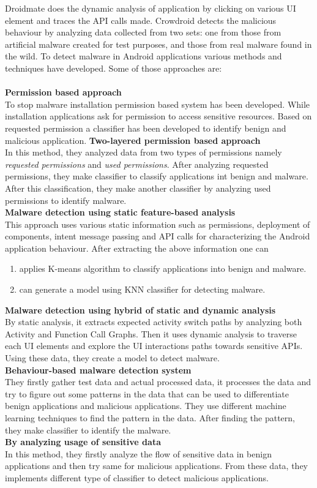 Droidmate \cite{jamrozik2016droidmate} does the dynamic analysis of application by clicking on various UI element and traces the API calls made. Crowdroid \cite{burguera2011crowdroid} detects the malicious behaviour by analyzing data collected from two sets: one from those from artiﬁcial malware created for test purposes, and those from real malware found in the wild. To detect malware in Android applications various methods and techniques have developed. Some of those approaches are:
\\
\\
\textbf{Permission based approach}\\
To stop malware installation permission based system has been developed. While installation applications ask for permission to access sensitive resources. Based on requested permission a classifier has been developed to identify benign and malicious application.
\textbf{Two-layered permission based approach}\\
In this method, they analyzed data from two types of permissions namely \textit{requested permissions} and \textit{used permissions}. After analyzing requested permissions, they make classifier to classify applications int benign and malware. After this classification, they make another classifier by analyzing used permissions to identify malware.\\
\textbf{Malware detection using static feature-based analysis}\\
This approach uses various static information such as permissions, deployment of components, intent message passing and API calls for characterizing the Android application behaviour. After extracting the above information one can
\begin{enumerate}
    \item applies K-means algorithm to classify applications into benign and malware.
    \item can generate a model using KNN classifier for detecting malware.
\end{enumerate}
\textbf{Malware detection using hybrid of static and dynamic analysis}\\
By static analysis, it extracts expected activity switch paths by analyzing both Activity and Function Call Graphs. Then it uses dynamic analysis to traverse each UI elements and explore the UI interactions paths towards sensitive APIs. Using these data, they create a model to detect malware.\\
\textbf{Behaviour-based malware detection system}\\
They firstly gather test data and actual processed data, it processes the data and try to figure out some patterns in the data that can be used to differentiate benign applications and malicious applications. They use different machine learning techniques to find the pattern in the data. After finding the pattern, they make classifier to identify the malware.\\
\textbf{By analyzing usage of sensitive data}\\
In this method, they firstly analyze the flow of sensitive data in benign applications and then try same for malicious applications. From these data, they implements different type of classifier to detect malicious applications.

